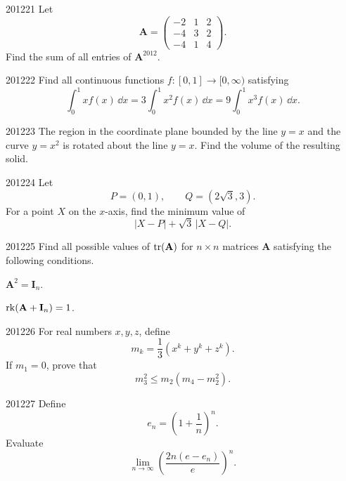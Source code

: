 
\begin{problem}{2012}{2}{1}
Let
\[
    \mathbf A=
    \begin{pmatrix}
        -2&1&2\\
        -4&3&2\\
        -4&1&4
    \end{pmatrix}.
\]
Find the sum of all entries of $\mathbf A^{2012}$.
\end{problem}

\begin{problem}{2012}{2}{2}
Find all continuous functions $f\colon[0, 1]\to[0, \infty)$ satisfying
\[
    \int_0^1 xf(x)\, \dd x
    =3\int_0^1 x^2f(x)\, \dd x
    =9\int_0^1 x^3f(x)\, \dd x.
\]
\end{problem}

\begin{problem}{2012}{2}{3}
The region in the coordinate plane bounded by the line $y=x$ and the curve $y=x^2$ is rotated about the line $y=x$. Find the volume of the resulting solid.
\end{problem}

\begin{problem}{2012}{2}{4}
Let
\[
    P=(0, 1),
    \qquad
    Q=(2\sqrt3, 3).
\]
For a point $X$ on the $x$-axis, find the minimum value of
\[
    |X-P|+\sqrt3\, |X-Q|.
\]
\end{problem}

\begin{problem}{2012}{2}{5}
Find all possible values of $\operatorname{tr}(\mathbf A)$ for $n\times n$ matrices $\mathbf A$ satisfying the following conditions.
\begin{problemclauses}
    \item $\mathbf A^2=\mathbf I_n$.
    \item $\operatorname{rk}(\mathbf A+\mathbf I_n)=1$.
\end{problemclauses}
\end{problem}

\begin{problem}{2012}{2}{6}
For real numbers $x, y, z$, define
\[
    m_k=\frac13(x^k+y^k+z^k).
\]
If $m_1=0$, prove that
\[
    m_3^2\le m_2(m_4-m_2^2).
\]
\end{problem}

\begin{problem}{2012}{2}{7}
Define
\[
    e_n=\left(1+\frac1n\right)^n.
\]
Evaluate
\[
    \lim_{n\to\infty}
    \left(\frac{2n(e-e_n)}{e}\right)^n.
\]
\end{problem}

